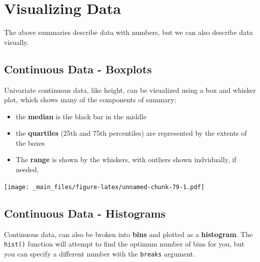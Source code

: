 \documentclass[
]{book}
\newenvironment{Shaded}{\begin{snugshade}}{\end{snugshade}}
\newcommand{\AttributeTok}[1]{\textcolor[rgb]{0.13,0.29,0.53}{#1}}
\newcommand{\FunctionTok}[1]{\textcolor[rgb]{0.13,0.29,0.53}{\textbf{#1}}}
\newcommand{\NormalTok}[1]{#1}
\newcommand{\SpecialCharTok}[1]{\textcolor[rgb]{0.81,0.36,0.00}{\textbf{#1}}}
\newcommand{\StringTok}[1]{\textcolor[rgb]{0.31,0.60,0.02}{#1}}
\providecommand{\tightlist}{%
  \setlength{\itemsep}{0pt}\setlength{\parskip}{0pt}}
\begin{document}
\hypertarget{visualizing-data-1}{%
\section*{Visualizing Data}\label{visualizing-data-1}}

The above summaries describe data with numbers, but we can also describe data visually.

\hypertarget{continuous-data---boxplots}{%
\subsection{Continuous Data - Boxplots}\label{continuous-data---boxplots}}

Univariate continuous data, like height, can be visualized using a box and whisker plot, which shows many of the components of summary:

\begin{itemize}
\tightlist
\item
  the \textbf{median} is the black bar in the middle
\item
  the \textbf{quartiles} (25th and 75th percentiles) are represented by the extents of the boxes
\item
  The \textbf{range} is shown by the whiskers, with outliers shown indvidually, if needed.
\end{itemize}

\begin{Shaded}
\end{Shaded}

\texttt{[image: \_main\_files/figure-latex/unnamed-chunk-79-1.pdf]}

\hypertarget{continuous-data---histograms}{%
\subsection{Continuous Data - Histograms}\label{continuous-data---histograms}}

Continuous data, can also be broken into \textbf{bins} and plotted as a \textbf{histogram}. The \texttt{hist()} function will attempt to find the optimum number of bins for you, but you can specify a different number with the \texttt{breaks} argument.

\begin{Shaded}
\end{Shaded}
\end{document}
